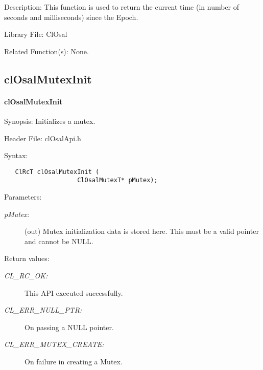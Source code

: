 \begin{Desc}
\item[Description:]This function is used to return the current time (in number of seconds and milliseconds) since the Epoch.\end{Desc}
\begin{Desc}
\item[Library File:]Cl\-Osal\end{Desc}
\begin{Desc}
\item[Related Function(s):]None. \end{Desc}

\newpage


\subsection{clOsalMutexInit}
\hypertarget{pageosal155}{}\paragraph{cl\-Osal\-Mutex\-Init}\label{pageosal155}
\begin{Desc}
\item[Synopsis:]Initializes a mutex.\end{Desc}
\begin{Desc}
\item[Header File:]clOsalApi.h\end{Desc}
\begin{Desc}
\item[Syntax:]

\footnotesize\begin{verbatim}   ClRcT clOsalMutexInit (
					ClOsalMutexT* pMutex);
\end{verbatim}
\normalsize
\end{Desc}
\begin{Desc}
\item[Parameters:]
\begin{description}
\item[{\em p\-Mutex:}](out) Mutex initialization data is stored here.
   This must be a valid pointer and cannot be NULL.\end{description}
\end{Desc}
\begin{Desc}
\item[Return values:]
\begin{description}
\item[{\em CL\_\-RC\_\-OK:}]This API executed successfully. 
\item[{\em CL\_\-ERR\_\-NULL\_\-PTR:}]On passing a NULL pointer.
\item[{\em CL\_\-ERR\_\-MUTEX\_\-CREATE:}]On failure in creating a Mutex.\end{description}
\end{Desc}
